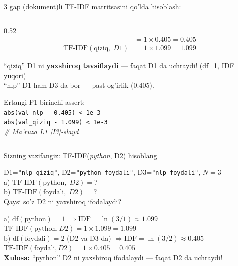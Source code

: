 \documentclass[aspectratio=169,11pt]{beamer}
\begin{document}
\begin{frame}{3 gap (dokument)li TF-IDF matritsasini qo'lda hisoblash:}
\begin{columns}[T]
\begin{column}{0.52\textwidth}
\begin{align*}
          &= 1 \times 0.405 = \mathbf{0.405}\\
        \mathrm{TF\text{-}IDF}(\text{qiziq},\; D1)
          &= 1 \times 1.099 = \mathbf{1.099}
      \end{align*}
      \begin{tcolorbox}[okbox,title=Xulosa,top=2pt,bottom=2pt]
        \footnotesize
        ``qiziq'' D1 ni \textbf{yaxshiroq tavsiflaydi}
        --- faqat D1 da uchraydi! (df=1, IDF yuqori)\\[2pt]
        ``nlp'' D1 ham D3 da bor
        --- past og'irlik ($0.405$).
      \end{tcolorbox}
      \vspace{3pt}
      \footnotesize\color{halfgray}
      Ertangi P1 birinchi assert:\\
      \texttt{abs(val\_nlp - 0.405) < 1e-3}\\
      \texttt{abs(val\_qiziq - 1.099) < 1e-3}\\
      \textit{\# Ma'ruza L1 [I3]-slayd}
    \end{column}
  \end{columns}
\end{frame}

\begin{frame}{Sizning vazifangiz: TF-IDF(\textit{python}, D2) hisoblang}
  \begin{tcolorbox}[warnbox,title=Savol --- 2 daqiqa (xuddi shu  yuqoridagi korpus)]
    \small
    D1=\texttt{"nlp qiziq"},\;
    D2=\texttt{"python foydali"},\;
    D3=\texttt{"nlp foydali"},\; $N=3$\\[4pt]
    a) $\mathrm{TF\text{-}IDF}(\text{python},\; D2) = ?$\\[3pt]
    b) $\mathrm{TF\text{-}IDF}(\text{foydali},\; D2) = ?$\\[3pt]
    \footnotesize Qaysi so'z D2 ni yaxshiroq ifodalaydi?
  \end{tcolorbox}
  \pause
  \begin{tcolorbox}[okbox,title=Javob]
    \small
    a)\; $\mathrm{df}(\text{python})=1$
       $\Rightarrow \mathrm{IDF}=\ln(3/1)\approx 1.099$\\
       $\mathrm{TF\text{-}IDF}(\text{python},D2)
         = 1 \times 1.099 = \mathbf{1.099}$\\[4pt]
    b)\; $\mathrm{df}(\text{foydali})=2$\; (D2 va D3 da)
       $\Rightarrow \mathrm{IDF}=\ln(3/2)\approx 0.405$\\
       $\mathrm{TF\text{-}IDF}(\text{foydali},D2)
         = 1 \times 0.405 = \mathbf{0.405}$\\[4pt]
    \textbf{Xulosa:} ``python'' D2 ni yaxshiroq ifodalaydi ---
    faqat D2 da uchraydi!
  \end{tcolorbox}
\end{frame}
\end{document}
